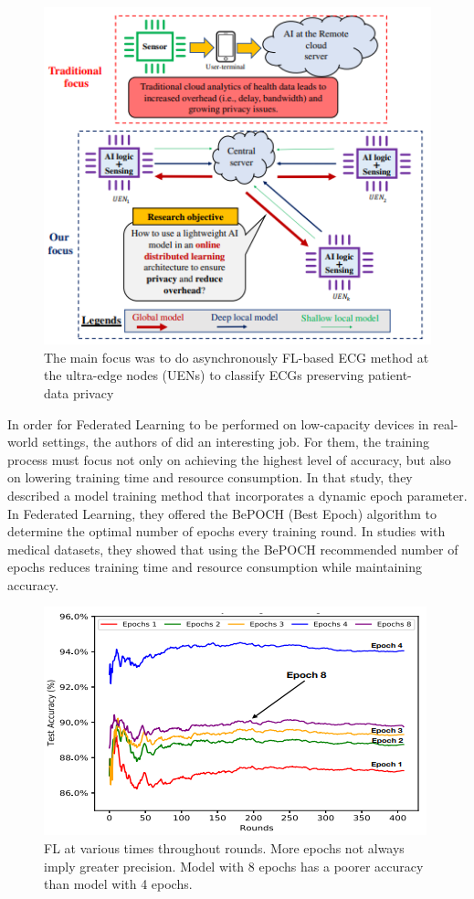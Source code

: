 \begin{figure}[H]
\centering
\includegraphics[scale=0.7]{img/fl2_focus.PNG}
\caption{The main focus was to do asynchronously
FL-based ECG method at the ultra-edge nodes (UENs) to classify ECGs preserving patient-data privacy\cite{fl2}}
\label{fig:fl2_focus}
\end{figure}

In order for Federated Learning to be performed on low-capacity devices in real-world settings, the authors of \cite{fl9} did an interesting job. For them, the training process must focus not only on achieving the highest level of accuracy, but also on lowering training time and resource consumption. In that study, they described a model training method that incorporates a dynamic epoch parameter. In Federated Learning, they offered the BePOCH (Best Epoch) algorithm to determine the optimal number of epochs every training round. In studies with medical datasets, they showed that using the BePOCH recommended number of epochs reduces training time and resource consumption while maintaining accuracy.

\begin{figure}[H]
\centering
\includegraphics[scale=0.8]{img/fl9_epochs.PNG}
\caption{FL at various times throughout rounds. More epochs not always imply greater precision. Model with 8 epochs has a poorer accuracy than model with 4 epochs. \cite{fl9}}
\label{fig:fl9_epochs}
\end{figure}


